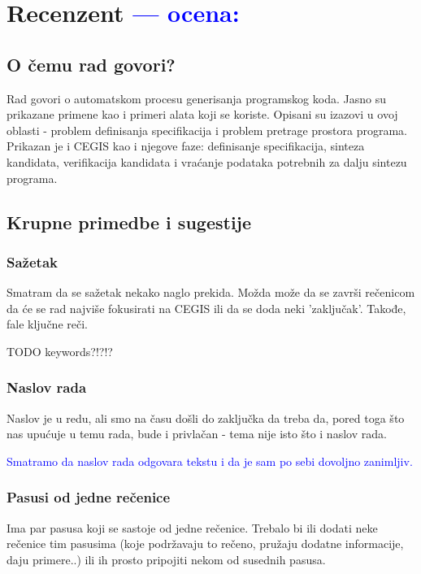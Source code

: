 \documentclass[a4paper]{report}
\newcommand{\odgovor}[1]{\textcolor{blue}{#1}}
\begin{document}
\chapter{Recenzent \odgovor{--- ocena:} }


\section{O čemu rad govori?}
Rad govori o automatskom procesu generisanja programskog koda. Jasno su prikazane primene kao i primeri alata koji se koriste. Opisani su izazovi u ovoj oblasti - problem definisanja specifikacija i problem pretrage prostora programa. Prikazan je i CEGIS kao i njegove faze: definisanje specifikacija, sinteza kandidata, verifikacija kandidata i vraćanje podataka potrebnih za dalju sintezu programa.


\section{Krupne primedbe i sugestije}


\subsection{Sažetak}

Smatram da se sažetak nekako naglo prekida. Možda može da se završi rečenicom da će se rad najviše fokusirati na CEGIS ili da se doda neki 'zaključak'. Takođe, fale ključne reči.

TODO keywords?!?!?


\subsection{Naslov rada}
Naslov je u redu, ali smo na času došli do zaključka da treba da, pored toga što nas upućuje u temu rada, bude i privlačan - tema nije isto što i naslov rada.

\odgovor{Smatramo da naslov rada odgovara tekstu i da je sam po sebi dovoljno zanimljiv.}

\subsection{Pasusi od jedne rečenice}
Ima par pasusa koji se sastoje od jedne rečenice. Trebalo bi ili dodati neke rečenice tim pasusima (koje podržavaju to rečeno, pružaju dodatne informacije, daju primere..) ili ih prosto pripojiti nekom od susednih pasusa.
\end{document}
